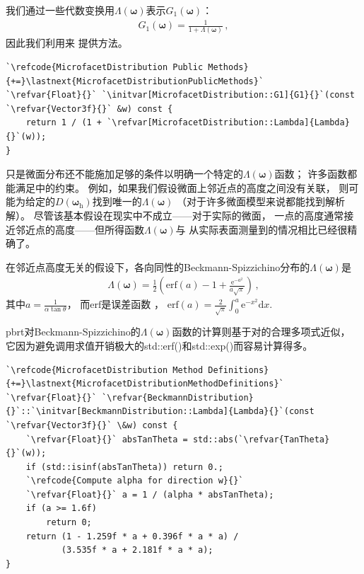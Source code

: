 我们通过一些代数变换用$\Lambda({\bm\omega})$表示$G_1({\bm\omega})$：
\begin{align*}
    G_1({\bm\omega})=\frac{1}{1+\Lambda({\bm\omega})}\, ,
\end{align*}
因此我们利用来
提供方法。
\begin{lstlisting}
`\refcode{MicrofacetDistribution Public Methods}{+=}\lastnext{MicrofacetDistributionPublicMethods}`
`\refvar{Float}{}` `\initvar[MicrofacetDistribution::G1]{G1}{}`(const `\refvar{Vector3f}{}` &w) const {
    return 1 / (1 + `\refvar[MicrofacetDistribution::Lambda]{Lambda}{}`(w));
}
\end{lstlisting}

只是微面分布还不能施加足够的条件以明确一个特定的$\Lambda({\bm\omega})$函数；
许多函数都能满足中的约束。
例如，如果我们假设微面上邻近点的高度之间没有关联，
则可能为给定的$D({\bm\omega}_{\mathrm{h}})$找到唯一的$\Lambda({\bm\omega})$
（对于许多微面模型来说都能找到解析解）。
尽管该基本假设在现实中不成立——对于实际的微面，
一点的高度通常接近邻近点的高度——但所得函数$\Lambda({\bm\omega})$与
从实际表面测量到的情况相比已经很精确了。

在邻近点高度无关的假设下，各向同性的Beckmann-Spizzichino分布的$\Lambda({\bm\omega})$是
\begin{align}\label{eq:8.14}
    \Lambda({\bm\omega})=\frac{1}{2}\left(\mathrm{erf}(a)-1+\frac{\mathrm{e}^{-a^2}}{a\sqrt{\pi}}\right)\, ,
\end{align}
其中$a=\displaystyle\frac{1}{\alpha\tan\theta}$，
而$\mathrm{erf}$是误差函数
，
$\displaystyle\mathrm{erf}(a)=\frac{2}{\sqrt{\pi}}\int_0^a\mathrm{e}^{-x^2}\mathrm{d}x$.

pbrt对Beckmann-Spizzichino的$\Lambda({\bm\omega})$函数的计算则基于对的合理多项式近似，
它因为避免调用求值开销极大的{\ttfamily std::erf()}和{\ttfamily std::exp()}而容易计算得多。
\begin{lstlisting}
`\refcode{MicrofacetDistribution Method Definitions}{+=}\lastnext{MicrofacetDistributionMethodDefinitions}`
`\refvar{Float}{}` `\refvar{BeckmannDistribution}{}`::`\initvar[BeckmannDistribution::Lambda]{Lambda}{}`(const `\refvar{Vector3f}{}` \&w) const {
    `\refvar{Float}{}` absTanTheta = std::abs(`\refvar{TanTheta}{}`(w));
    if (std::isinf(absTanTheta)) return 0.;
    `\refcode{Compute alpha for direction w}{}`
    `\refvar{Float}{}` a = 1 / (alpha * absTanTheta);
    if (a >= 1.6f)
        return 0;
    return (1 - 1.259f * a + 0.396f * a * a) /
           (3.535f * a + 2.181f * a * a);
}
\end{lstlisting}

